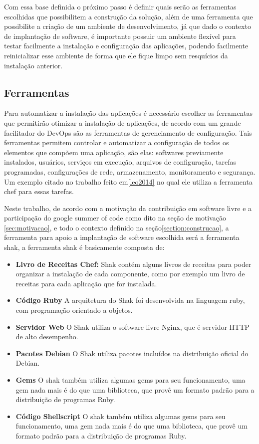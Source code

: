 Com essa base definida o próximo passo é definir quais serão as ferramentas
escolhidas que possibilitem a construção da solução, além de uma ferramenta
que possibilite a criação de um ambiente de desenvolvimento, já que dado o
contexto de implantação de software, é importante possuir um ambiente flexível
para testar facilmente a instalação e configuração das aplicações,
podendo facilmente reinicializar esse ambiente de forma que ele fique limpo sem
resquícios da instalação anterior.

\subsection{Ferramentas}

Para automatizar a instalação das aplicações é necessário escolher as ferramentas
que permitirão otimizar a instalação de aplicações, de acordo com\cite{6265084}
um grande facilitador do DevOps são as ferramentas de gerenciamento de configuração.
Tais ferramentas permitem controlar e automatizar a configuração de todos os
elementos que compõem uma aplicação, são elas: softwares previamente instalados,
usuários, serviços em execução, arquivos de configuração, tarefas programadas,
configurações de rede, armazenamento, monitoramento e segurança. Um exemplo citado
no trabalho feito em\ref{leo2014} no qual ele utiliza a ferramenta chef para
essas tarefas.

Neste trabalho, de acordo com a motivação da contribuição em software livre
e a participação do google summer of code como dito na seção de motivação
\ref{sec:motivacao}, e todo o contexto definido na seção\ref{section:construcao},
a ferramenta para apoio a implantação de software escolhida
será a ferramenta shak, a ferramenta shak é basicamente composta de:

\begin{itemize}
  \item  \textbf{Livro de Receitas Chef:} Shak contém alguns livros de receitas
  para poder organizar a instalação de cada componente, como por exemplo um livro
  de receitas para cada aplicação que for instalada.
  \item  \textbf{Código Ruby} A arquitetura do Shak foi desenvolvida na linguagem
  ruby, com programação orientado a objetos.
  \item  \textbf{Servidor Web} O Shak utiliza o software livre Nginx, que é
  servidor HTTP de alto desempenho\cite{nginx}.
  \item  \textbf{Pacotes Debian} O Shak utiliza pacotes incluídos na distribuição
  oficial do Debian.
  \item  \textbf{Gems} O shak também utiliza algumas gems para seu funcionamento,
  uma gem nada mais é do que uma biblioteca, que provê um formato padrão para
  a distribuição de programas Ruby\cite{gem}.
  \item  \textbf{Código Shellscript} O shak também utiliza algumas gems para seu funcionamento,
  uma gem nada mais é do que uma biblioteca, que provê um formato padrão para
  a distribuição de programas Ruby\cite{gem}.
\end{itemize}

